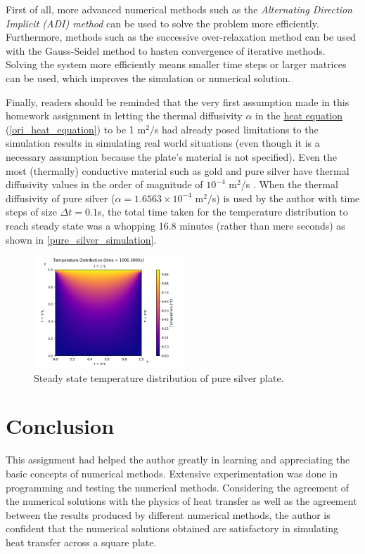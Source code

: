 \documentclass[a4paper]{article}
\begin{document}
		First of all, more advanced numerical methods such as the \emph{Alternating Direction Implicit (ADI) method} can be used to solve the problem more efficiently. Furthermore, methods such as the successive over-relaxation method can be used with the Gauss-Seidel method to hasten convergence of iterative methods. Solving the system more efficiently means smaller time steps or larger matrices can be used, which improves the simulation or numerical solution.
		
		Finally, readers should be reminded that the very first assumption made in this homework assignment in letting the thermal diffusivity $\alpha$ in the \hyperref[ori_heat_equation]{heat equation} (\autoref{ori_heat_equation}) to be 1 m$^2/$s had already posed limitations to the simulation results in simulating real world situations (even though it is a necessary assumption because the plate's material is not specified). Even the most (thermally) conductive material such as gold and pure silver have thermal diffusivity values in the order of magnitude of $10^{-4}$ m$^2$/s \citep{Brown1958}. When the thermal diffusivity of pure silver ($\alpha = 1.6563\times 10^{-4}$ m$^2/$s) is used by the author with time steps of size $\Delta t = 0.1$s, the total time taken for the temperature distribution to reach steady state was a whopping 16.8 minutes (rather than mere seconds) as shown in \autoref{pure_silver_simulation}.
		\begin{figure}[H]
			\centering
			\includegraphics[width=0.5\textwidth]{figures/pure_silver}
			\caption{Steady state temperature distribution of pure silver plate.}
			\label{pure_silver_simulation}
		\end{figure}
		
\section{Conclusion}
	This assignment had helped the author greatly in learning and appreciating the basic concepts of numerical methods. Extensive experimentation was done in programming and testing the numerical methods. Considering the agreement of the numerical solutions with the physics of heat transfer as well as the agreement between the results produced by different numerical methods, the author is confident that the numerical solutions obtained are satisfactory in simulating heat transfer across a square plate.
\end{document}
